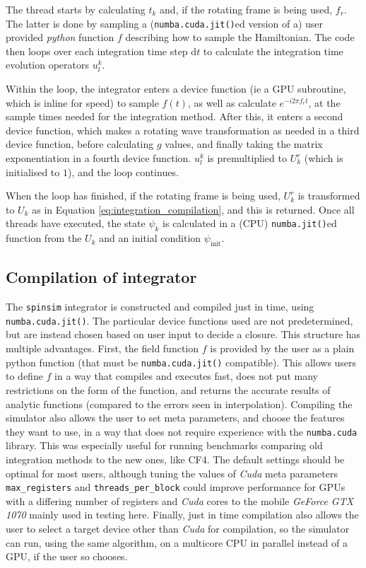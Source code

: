 \documentclass{jors}
\begin{document}
		The thread starts by calculating \(t_k\) and, if the rotating frame is being used, \(f_r\). The latter is done by sampling a (\texttt{numba.cuda.jit()}ed version of a) user provided \emph{python} function \(f\) describing how to sample the Hamiltonian. The code then loops over each integration time step \(\mathrm{d}t\) to calculate the integration time evolution operators \(u^k_l\).
		
		Within the loop, the integrator enters a device function (ie a GPU subroutine, which is inline for speed) to sample \(f(t)\), as well as calculate \(e^{-i 2 \pi f_r t}\), at the sample times needed for the integration method. After this, it enters a second device function, which makes a rotating wave transformation as needed in a third device function, before calculating \(g\) values, and finally taking the matrix exponentiation in a fourth device function. \(u^k_l\) is premultiplied to \(U^r_k\) (which is initialised to \(1\)), and the loop continues.
		
		When the loop has finished, if the rotating frame is being used, \(U^r_k\) is transformed to \(U_k\) as in Equation \eqref{eq:integration_compilation}, and this is returned. Once all threads have executed, the state \(\psi_k\) is calculated in a (CPU) \texttt{numba.jit()}ed function from the \(U_k\) and an initial condition \(\psi_{\mathrm{init}}\).


	\subsection{Compilation of integrator}
		The \texttt{spinsim} integrator is constructed and compiled just in time, using \texttt{numba.cuda.jit()}. The particular device functions used are not predetermined, but are instead chosen based on user input to decide a closure. This structure has multiple advantages. First, the field function \(f\) is provided by the user as a plain python function (that must be \texttt{numba.cuda.jit()} compatible). This allows users to define \(f\) in a way that compiles and executes fast, does not put many restrictions on the form of the function, and returns the accurate results of analytic functions (compared to the errors seen in interpolation). Compiling the simulator also allows the user to set meta parameters, and choose the features they want to use, in a way that does not require experience with the \texttt{numba.cuda} library. This was especially useful for running benchmarks comparing old integration methods to the new ones, like CF4. The default settings should be optimal for most users, although tuning the values of \emph{Cuda} meta parameters \texttt{max\_registers} and \texttt{threads\_per\_block} could improve performance for GPUs with a differing number of registers and \emph{Cuda} cores to the mobile \emph{GeForce GTX 1070} mainly used in testing here. Finally, just in time compilation also allows the user to select a target device other than \emph{Cuda} for compilation, so the simulator can run, using the same algorithm, on a multicore CPU in parallel instead of a GPU, if the user so chooses.
		
\end{document}
